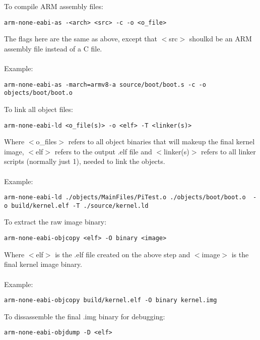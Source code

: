 \documentclass[12pt]{book}
\begin{document}
To compile ARM assembly files:
\begin{lstlisting}[style = bash, xleftmargin=0\textwidth]
	arm-none-eabi-as -<arch> <src> -c -o <o_file>
\end{lstlisting}

The flags here are the same as above, except that $<$src$>$ shoulkd be an ARM assembly file instead of a C file.
\\~\\
Example:
\begin{lstlisting}[style = bash, xleftmargin=0\textwidth]
	arm-none-eabi-as -march=armv8-a source/boot/boot.s -c -o objects/boot/boot.o
\end{lstlisting}

To link all object files:
\begin{lstlisting}[style = bash, xleftmargin=0\textwidth]
	arm-none-eabi-ld <o_file(s)> -o <elf> -T <linker(s)>
\end{lstlisting}

Where $<$o\_files$>$ refers to all object binaries that will makeup the final kernel image, $<$elf$>$ refers to the output .elf file and $<$linker(s)$>$ refers to all linker scripts (normally just 1), needed to link the objects.
\\~\\
Example:
\begin{lstlisting}[style = bash, xleftmargin=0\textwidth]
	arm-none-eabi-ld ./objects/MainFiles/PiTest.o ./objects/boot/boot.o  -o build/kernel.elf -T ./source/kernel.ld
\end{lstlisting}

To extract the raw image binary:
\begin{lstlisting}[style = bash, xleftmargin=0\textwidth]
	arm-none-eabi-objcopy <elf> -O binary <image>
\end{lstlisting}

Where $<$elf$>$ is the .elf file created on the above step and $<$image$>$ is the final kernel image binary. 
\\~\\
Example:
\begin{lstlisting}[style = bash, xleftmargin=0\textwidth]
	arm-none-eabi-objcopy build/kernel.elf -O binary kernel.img
\end{lstlisting}

To \hypertarget{disassemble}{dissassemble} the final .img binary for debugging:
\begin{lstlisting}[style = bash, xleftmargin=0\textwidth]
	arm-none-eabi-objdump -D <elf>
\end{lstlisting}
\end{document}
